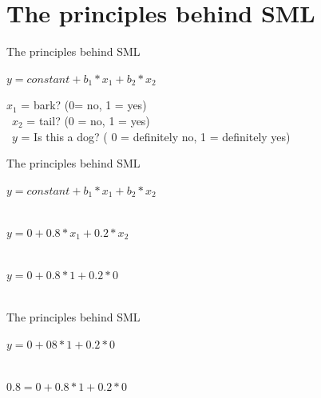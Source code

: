 \documentclass[handout]{beamer}
\begin{document}
	
	\section{The principles behind SML}
	
	\begin{frame}{The principles behind SML} 
		
		\(y = constant + b_1 * x_1 + b_2 * x_2\) 
		
		\(x_1\) = bark? (0= no, 1 = yes) \\\
		\(x_2\) = tail? (0 = no, 1 = yes) \\\
		\(y\) = Is this a dog? ( 0 = definitely no, 1 = definitely yes)
		
		
	\end{frame}
	
	
	\begin{frame}{The principles behind SML} 
		
		\(y = constant + b_1 * x_1 + b_2 * x_2\) \\\
		
		\(y = 0 + 0.8 * x_1 + 0.2 * x_2\) \\\
		
		\(y = 0 + 0.8 * 1 + 0.2 * 0\) \\\
		
		
	\end{frame}
	
	\begin{frame}{The principles behind SML} 
		
		\(y = 0 + 08 * 1 + 0.2 * 0\) \\\
		
		\(0.8 = 0 + 0.8 * 1 + 0.2 * 0\) \\\
		
		
	\end{frame}
	
\end{document}
